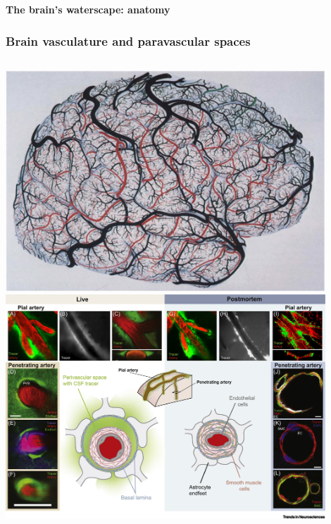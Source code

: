 \documentclass[mathserif, aspectratio=169]{beamer}
\newcommand{\mysection}[1]{\begin{frame} \begin{center} \vspace{3em} \textbf{#1} \end{center} \end{frame}}
\begin{document}

%
% 
%

\mysection{The brain's waterscape: anatomy}



\begin{frame}
  \frametitle{Brain vasculature and paravascular spaces}
  \vspace{-1em}
  \begin{columns}[c]
      \begin{column}{0.4\textwidth}
      \begin{center}
        \includegraphics[width=0.9\textwidth]{graphics/uludag_et_al_2018_fig2.jpg} \\
        \includegraphics[width=0.9\textwidth]{graphics/mestre_mori_nedergaard_2020_fig2.jpg}

\end{center}
\end{column}
\end{columns}
\end{frame}
\end{document}
